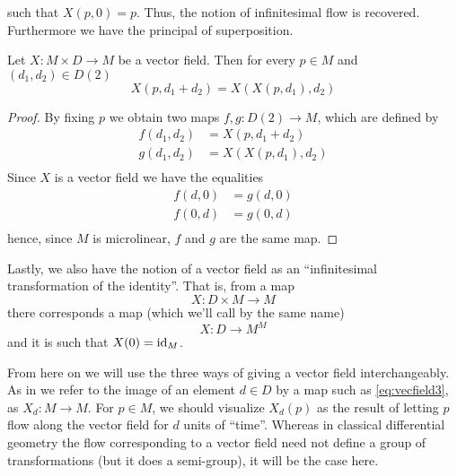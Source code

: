 such that \( X(p,0)=p \). Thus, the notion of infinitesimal flow is recovered. Furthermore we have the principal of superposition.

\begin{proposition}
Let \( X:M\times D\to M \) be a vector field. Then for every \( p\in M \) and \( (d_1,d_2)\in D(2) \)
\begin{equation*}
  X(p,d_1+d_2) = X(X(p,d_1),d_2)
\end{equation*}
\label{prop:superpos}
\end{proposition}

\begin{proof}
  By fixing \( p \) we obtain two maps \( f,g:D(2)\to M \), which are defined by
  \begin{align*}
    f(d_1,d_2) &= X(p,d_1+d_2)    \\
    g(d_1,d_2) &= X(X(p,d_1),d_2) \\
  \end{align*}
  Since \( X \) is a vector field we have the equalities
  \begin{align*}
    f(d,0) &= g(d,0) \\
    f(0,d) &= g(0,d) \\
  \end{align*}
  hence, since \( M \) is microlinear, \( f \) and \( g \) are the same map.
\end{proof}

Lastly, we also have the notion of a vector field as an ``infinitesimal transformation of the identity''. That is, from a map
\begin{equation*}
  X:D\times M\to M
\end{equation*}
there corresponds a map (which we'll call by the same name)
\begin{equation}
  X:D\to M^M
  \label{eq:vecfield3}
\end{equation}
and it is such that \( X(0)=\operatorname{id}_M \).

From here on we will use the three ways of giving a vector field interchangeably. As in \cite{lav96} we refer to the image of an element \( d\in D \) by a map such as \ref{eq:vecfield3}, as \( X_d:M\to M \). For \( p\in M \), we should visualize \( X_d(p) \) as the result of letting \( p \) flow along the vector field for \( d \) units of ``time''. Whereas in classical differential geometry the flow corresponding to a vector field need not define a group of transformations (but it does a semi-group), it will be the case here.

